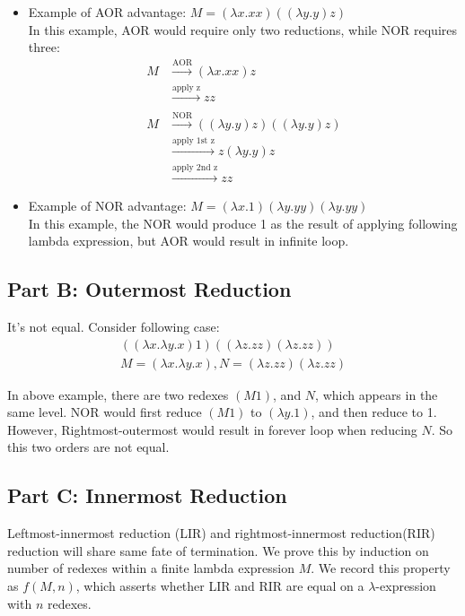 \documentclass[paper=a4, fontsize=11pt]{scrartcl} %
\numberwithin{equation}{section} %
\numberwithin{figure}{section} %
\numberwithin{table}{section} %
\begin{document}
\begin{itemize}
\item Example of AOR advantage: $M = (\lambda x. xx) ((\lambda y. y)z)$ \\
In this example, AOR would require only two reductions, while NOR requires three:
\begin{align*}
  M & \xrightarrow{\text{AOR}} (\lambda x. xx) z\\
    & \xrightarrow{\text{apply z}} zz\\
  \\
  M & \xrightarrow{\text{NOR}} ((\lambda y. y)z) ((\lambda y. y)z)\\
    & \xrightarrow{\text{apply 1st z}} z(\lambda y. y)z\\
    & \xrightarrow{\text{apply 2nd z}} zz
\end{align*}

\item Example of NOR advantage: $M=(\lambda x. 1) (\lambda y. yy) (\lambda y. yy)$\\
In this example, the NOR would produce 1 as the result of applying following lambda expression, but AOR would result in infinite loop.

\end{itemize}

\subsection{Part B: Outermost Reduction}
It's not equal. Consider following case:
\begin{align*}
  ((\lambda x. \lambda y. x) 1) ((\lambda z. zz) (\lambda z. zz)) \\
  M = (\lambda x. \lambda y. x), N = (\lambda z.zz) (\lambda z.zz)
\end{align*}

In above example, there are two redexes $(M 1)$, and $N$, which appears in the same level. NOR would first reduce $(M 1)$ to
$ (\lambda y. 1) $, and then reduce to 1. However, Rightmost-outermost would result in forever loop when reducing $N$. So this two orders are not equal.

\subsection{Part C: Innermost Reduction}
Leftmost-innermost reduction (LIR) and rightmost-innermost reduction(RIR) reduction will share same fate of termination.
We prove this by induction on number of redexes within a finite lambda expression $M$. We record this property as $f(M,n)$, which asserts whether LIR and RIR are equal on a $\lambda$-expression with $n$ redexes.
\end{document}

